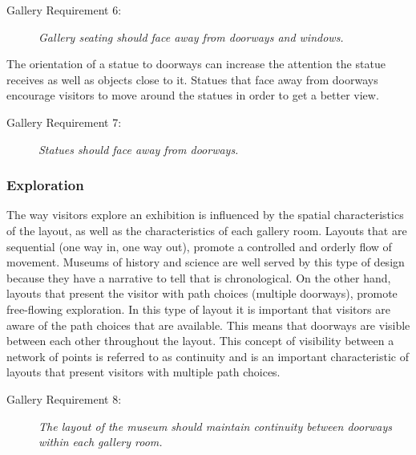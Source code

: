 \documentclass[12pt]{ucthesis}
\begin{document}
\begin{description}
\item[Gallery Requirement 6:] \emph{Gallery seating should face away from doorways and windows.}
\end{description}

The orientation of a statue to doorways can increase the attention the statue receives as well as objects close to it. Statues that face away from doorways encourage visitors to move around the statues in order to get a better view.  
\begin{description}
\item[Gallery Requirement 7:] \emph{Statues should face away from doorways.}
\end{description}


\subsubsection{Exploration}
The way visitors explore an exhibition is influenced by the spatial characteristics of the layout, as well as the characteristics of each gallery room. Layouts that are sequential (one way in, one way out), promote a controlled and orderly flow of movement. Museums of history and science are well served by this type of design because they have a narrative to tell that is chronological. On the other hand, layouts that present the visitor with path choices (multiple doorways), promote free-flowing exploration. In this type of layout it is important that visitors are aware of the path choices that are available. This means that doorways are visible between each other throughout the layout. This concept of visibility between a network of points is referred to as continuity and is an important characteristic of layouts that present visitors with multiple path choices.  

\begin{description}
\item[Gallery Requirement 8:] \emph{The layout of the museum should maintain continuity between doorways within each gallery room.}
\end{description}

\end{document}
